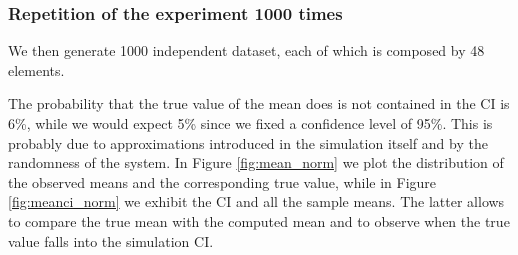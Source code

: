 \documentclass[twoside,onecolumn]{article}
\theoremstyle{definition}
\begin{document}
\subsubsection{Repetition of the experiment 1000 times}
We then generate 1000 independent dataset, each of which is composed by 48 elements. 

The probability that the true value of the mean does is not contained in the CI is 6\%, while we would expect 5\% since we fixed a confidence level of 95\%. This is probably due to approximations introduced in the simulation itself and by the randomness of the system.
In Figure \ref{fig:mean_norm} we plot the distribution of the observed means and the corresponding true value, while in Figure \ref{fig:meanci_norm} we exhibit the CI and all the sample means. The latter allows to compare the true mean with the computed mean and to observe when the true value falls into the simulation CI.
\end{document}
